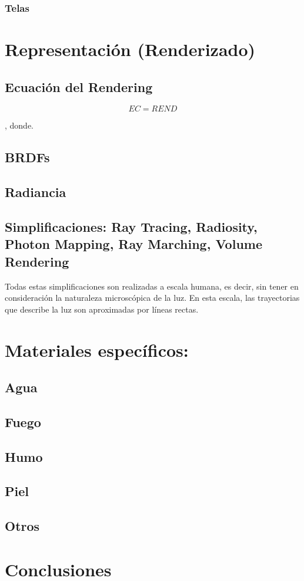 \subsubsection{Telas}

\section{Representación (Renderizado)}
\subsection{Ecuación del Rendering}

\begin{equation}
EC  = REND
\end{equation}

, donde.


\subsection{BRDFs}
\subsection{Radiancia}
\subsection{Simplificaciones: Ray Tracing, Radiosity, Photon Mapping, Ray Marching, Volume Rendering }
Todas estas simplificaciones son realizadas a escala humana, es decir, sin tener en consideración la naturaleza microscópica de la luz. En esta escala, las trayectorias que describe la luz son aproximadas por líneas rectas.
\section{Materiales específicos:}
\subsection{Agua}
\subsection{Fuego}
\subsection{Humo}
\subsection{Piel}
\subsection{Otros}


\section{Conclusiones}
